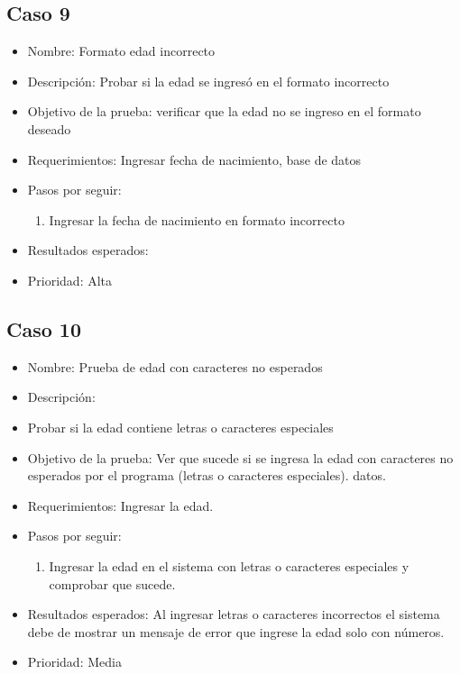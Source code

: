 \documentclass[conference]{IEEEtran}
\begin{document}
\subsection{Caso 9}
\begin{itemize}
\item Nombre: Formato edad incorrecto 
\item Descripción: Probar si la edad se ingresó en el formato incorrecto
\item Objetivo de la prueba: verificar que la edad no se ingreso en el formato deseado 
\item Requerimientos: Ingresar fecha de nacimiento, base de datos 
\item Pasos por seguir: 
\begin{enumerate}
\item Ingresar la fecha de nacimiento en formato incorrecto
\end{enumerate}
\item Resultados esperados: 
\item Prioridad: Alta
\end{itemize}

\subsection{Caso 10}
\begin{itemize}
\item Nombre: Prueba de edad con caracteres no esperados 
\item Descripción: \item Probar si la edad contiene letras o caracteres especiales
\item Objetivo de la prueba: Ver que sucede si se ingresa la edad con caracteres no esperados por el programa (letras o caracteres especiales).
datos.
\item Requerimientos: Ingresar la edad. 
\item Pasos por seguir: 
\begin{enumerate}
\item Ingresar la edad en el sistema con letras o caracteres especiales y comprobar que sucede.
\end{enumerate}
\item Resultados esperados: Al ingresar letras o caracteres incorrectos el sistema debe de mostrar un mensaje de error que ingrese la edad solo con números.
\item Prioridad: Media
\end{itemize}
\end{document}
